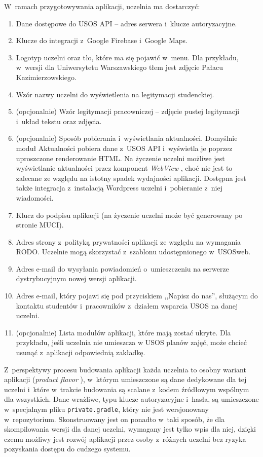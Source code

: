 \documentclass{pracamgr}
\begin{document}
W~ramach przygotowywania aplikacji, uczelnia ma dostarczyć:
\begin{enumerate}
	\item Dane dostępowe do USOS API -- adres serwera i~klucze autoryzacyjne.
	\item Klucze do integracji z~Google Firebase i~Google Maps.
	\item Logotyp uczelni oraz tło, które ma się pojawić w~menu. Dla przykładu, w~wersji dla Uniwersytetu Warszawskiego
        tłem jest zdjęcie Pałacu Kazimierzowskiego.
	\item Wzór nazwy uczelni do wyświetlenia na legitymacji studenckiej.
	\item (opcjonalnie) Wzór legitymacji pracowniczej -- zdjęcie pustej legitymacji i~układ tekstu oraz zdjęcia.
	\item (opcjonalnie) Sposób pobierania i~wyświetlania aktualności. Domyślnie moduł Aktualności pobiera dane z~USOS
        API i~wyświetla je poprzez uproszczone renderowanie HTML. Na życzenie uczelni możliwe jest wyświetlanie
        aktualności przez komponent \textit{WebView} \cite{webview}, choć nie jest to zalecane ze względu na istotny
        spadek wydajności aplikacji. Dostępna jest także integracja z~instalacją Wordpress uczelni i~pobieranie z~niej wiadomości.
	\item Klucz do podpisu aplikacji (na życzenie uczelni może być generowany po stronie MUCI).
	\item Adres strony z~polityką prywatności aplikacji ze względu na wymagania RODO. Uczelnie mogą skorzystać z~szablonu udostępnionego w~USOSweb.
	\item Adres e-mail do wysyłania powiadomień o~umieszczeniu na serwerze dystrybucyjnym nowej wersji aplikacji.
	\item Adres e-mail, który pojawi się pod przyciskiem ,,Napisz do nas'', służącym do kontaktu studentów i~pracowników z~działem wsparcia USOS na danej uczelni.
	\item (opcjonalnie) Lista modułów aplikacji, które mają zostać ukryte. Dla przykładu, jeśli
	uczelnia nie umieszcza w USOS planów zajęć, może chcieć usunąć z~aplikacji odpowiednią
	zakładkę.
\end{enumerate}

Z~perspektywy procesu budowania aplikacji każda uczelnia to osobny wariant aplikacji 
(\textit{product flavor} \cite{product-flavor}), w~którym umieszczone są dane dedykowane dla tej uczelni i~które w~trakcie
budowania są scalane z~kodem źródłowym wspólnym dla wszystkich. Dane wrażliwe, typu klucze autoryzacyjne i~hasła, są
umieszczone w~specjalnym pliku \texttt{private.gradle}, który nie jest wersjonowany w~repozytorium. Skonstruowany jest on
ponadto w~taki sposób, że dla skompilowania wersji dla danej uczelni, wymagany jest tylko wpis dla niej, dzięki czemu
możliwy jest rozwój aplikacji przez osoby z~różnych uczelni bez ryzyka pozyskania dostępu do cudzego systemu.
\end{document}
